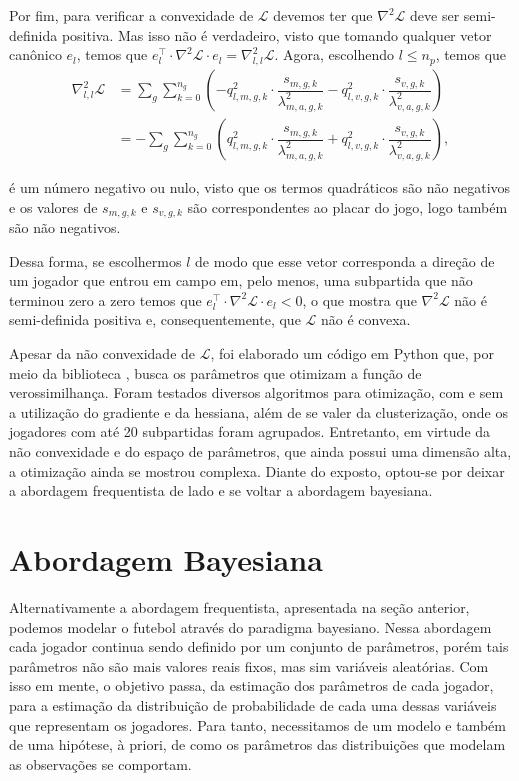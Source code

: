 Por fim, para verificar a convexidade de $\mathcal{L}$ devemos ter que $\nabla^2 \mathcal{L}$ deve ser semi-definida positiva. Mas isso não é verdadeiro, visto que tomando qualquer vetor canônico $e_l$, temos que $e_l^\top\cdot \nabla^2 \mathcal{L}\cdot e_l = \nabla_{l, l}^2 \mathcal{L}$. Agora, escolhendo $l \leq n_p$, temos que
\begin{equation*}
    \begin{split}
        \nabla_{l, l}^2 \mathcal{L} & = \sum_{g}\sum_{k = 0}^{n_g} \left(- q_{l, m, g, k}^2\cdot \dfrac{s_{m, g, k}}{\lambda_{m, a, g, k}^2} - q_{l, v, g, k}^2\cdot \dfrac{s_{v, g, k}}{\lambda_{v, a, g, k}^2}\right) \\
        & = - \sum_{g}\sum_{k = 0}^{n_g} \left(q_{l, m, g, k}^2\cdot \dfrac{s_{m, g, k}}{\lambda_{m, a, g, k}^2} + q_{l, v, g, k}^2\cdot \dfrac{s_{v, g, k}}{\lambda_{v, a, g, k}^2}\right),
    \end{split}
\end{equation*}

\noindent é um número negativo ou nulo, visto que os termos quadráticos são não negativos e os valores de $s_{m, g, k}$ e $s_{v, g, k}$ são correspondentes ao placar do jogo, logo também são não negativos.

Dessa forma, se escolhermos $l$ de modo que esse vetor corresponda a direção de um jogador que entrou em campo em, pelo menos, uma subpartida que não terminou zero a zero temos que $e_l^\top\cdot \nabla^2 \mathcal{L}\cdot e_l < 0$, o que mostra que $\nabla^2 \mathcal{L}$ não é semi-definida positiva e, consequentemente, que $\mathcal{L}$ não é convexa.

Apesar da não convexidade de $\mathcal{L}$, foi elaborado um código em Python que, por meio da biblioteca , busca os parâmetros que otimizam a função de verossimilhança. Foram testados diversos algoritmos para otimização, com e sem a utilização do gradiente e da hessiana, além de se valer da clusterização, onde os jogadores com até 20 subpartidas foram agrupados. Entretanto, em virtude da não convexidade e do espaço de parâmetros, que ainda possui uma dimensão alta, a otimização ainda se mostrou complexa. Diante do exposto, optou-se por deixar a abordagem frequentista de lado e se voltar a abordagem bayesiana.

\section{Abordagem Bayesiana}

Alternativamente a abordagem frequentista, apresentada na seção anterior, podemos modelar o futebol através do paradigma bayesiano. Nessa abordagem cada jogador continua sendo definido por um conjunto de parâmetros, porém tais parâmetros não são mais valores reais fixos, mas sim variáveis aleatórias. Com isso em mente, o objetivo passa, da estimação dos parâmetros de cada jogador, para a estimação da distribuição de probabilidade de cada uma dessas variáveis que representam os jogadores. Para tanto, necessitamos de um modelo e também de uma hipótese, à priori, de como os parâmetros das distribuições que modelam as observações se comportam.


